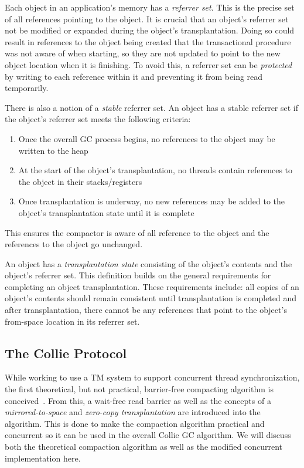 \documentclass{sig-alternate}
\begin{document}
Each object in an application's memory has a \emph{referrer set}. This is the precise set 
of all references pointing to the object. It is crucial that an object's referrer set not
be modified or expanded during the object's transplantation. Doing so could result
in references to the object being created that the transactional procedure
was not aware of when starting, so they are not updated to point to 
the new object location when it is finishing. To avoid this, a referrer set can be
\emph{protected} by writing to each reference within it and preventing it from
being read temporarily.

There is also a notion of a \emph{stable} referrer set. An object has a stable referrer 
set if the object's referrer set meets the following criteria:
\begin{enumerate}
\item Once the overall GC process begins, no references to the object may be written to the heap
\item At the start of the object's transplantation, no threads contain references to the object in their stacks/registers
\item Once transplantation is underway, no new references may be added to the object's transplantation state until it is complete
\end{enumerate}
This ensures the compactor is aware of all reference to the object
and the references to the object go unchanged.

An object has a \emph{transplantation state} consisting of the object's contents 
and the object's referrer set. This definition builds on the general requirements
for completing an object transplantation. These
requirements include: all copies of an object's contents should remain consistent
until transplantation is completed and after transplantation, there cannot be any
references that point to the object's from-space location in its referrer set.


\subsection{The Collie Protocol}
\label{sec:collieAlgorithm}

While working to use a TM system to support concurrent thread 
synchronization, the first theoretical, 
but not practical, barrier-free compacting algorithm is 
conceived~\cite{Iyengar:Collie}. From this,
a wait-free read barrier as well as
the concepts of a \emph{mirrored-to-space} and 
\emph{zero-copy transplantation} are introduced into the algorithm.
This is done to make the compaction algorithm practical and concurrent
so it can be used in the overall Collie GC algorithm.
We will discuss both the theoretical compaction algorithm as well
as the modified concurrent implementation here.
\end{document}
